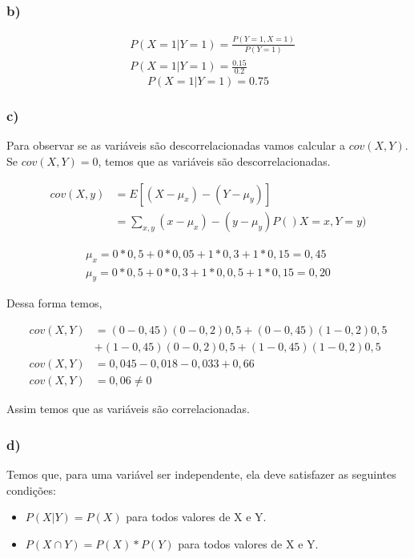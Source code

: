 \documentclass[12pt]{article}
\begin{document}

\subsubsection*{b)}
\begin{align*}
	&P(X=1|Y=1) = \frac{P(Y=1,X=1)}{P(Y=1)}\\
	&P(X=1|Y=1) =\frac{0.15}{0.2}
\end{align*}
\begin{equation*}
\boxed{P(X=1|Y=1) = 0.75}
\end{equation*}

\subsubsection*{c)}
Para observar se as variáveis são descorrelacionadas vamos calcular a $cov(X,Y)$. Se $cov(X,Y) = 0$, temos que as variáveis são descorrelacionadas.

\begin{align*}
	cov(X,y) &= E[(X-\mu_x)-(Y-\mu_y)]\\
			 &= \sum_{x,y}(x -\mu_x)-(y -\mu_y)P()X=x,Y=y)
\end{align*}

\begin{align*}
	\mu_x = 0*0,5+0*0,05+1*0,3+1*0,15 = 0,45\\
	\mu_y = 0*0,5+0*0,3+1*0,0,5+1*0,15 = 0,20
\end{align*}

Dessa forma temos,

\begin{align*}
	cov(X,Y) &= (0-0,45)(0-0,2)0,5 + (0-0,45)(1-0,2)0,5 \\
			 &+ (1-0,45)(0-0,2)0,5 + (1-0,45)(1-0,2)0,5\\
	cov(X,Y) &= 0,045-0,018-0,033+0,66 \\
	cov(X,Y) &= 0,06 \neq 0
\end{align*}

Assim temos que as variáveis são correlacionadas.

\subsubsection*{d)}

Temos que, para uma variável ser independente, ela deve satisfazer as seguintes condições:
\begin{itemize}
	\item $P(X|Y) = P(X)$ para todos valores de X e Y.
	
	\item $P(X \cap Y) = P(X)*P(Y)$ para todos valores de X e Y.
\end{itemize}
\end{document}
